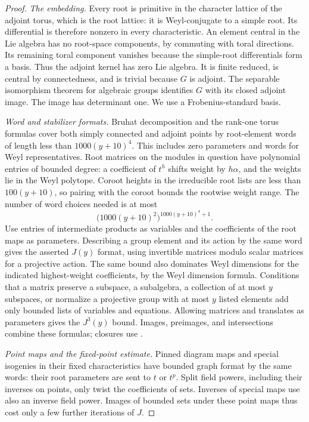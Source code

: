 \begin{proof}
\emph{The embedding.}
Every root is primitive in the character lattice of the adjoint torus,
which is the root lattice: it is Weyl-conjugate to a simple root.  Its
differential is therefore nonzero in every characteristic.  An element
central in the Lie algebra has no root-space components, by commuting with
toral directions.  Its remaining toral component vanishes because the
simple-root differentials form a basis.  Thus the adjoint kernel has zero
Lie algebra.  It is finite reduced, is central by connectedness, and is
trivial because $G$ is adjoint.  The separable isomorphism theorem for
algebraic groups identifies $G$ with its closed adjoint image.  The image
has determinant one.  We use a Frobenius-standard basis.

\emph{Word and stabilizer formats.}
Bruhat decomposition and the rank-one torus formulas cover both simply
connected and adjoint points by root-element words of length less than
$1000(y+10)^4$.  This includes zero parameters and words for Weyl
representatives.  Root matrices on the modules in question have polynomial
entries of bounded degree: a coefficient of $t^h$ shifts weight by $h\alpha$,
and the weights lie in the Weyl polytope.  Coroot heights in the irreducible
root lists are less than $100(y+10)$, so pairing with the coroot bounds the
rootwise weight range.  The number of word choices needed is at most
\begin{equation}\label{q:word-choices}
             \bigl(1000(y+10)^2\bigr)^{1000(y+10)^4+1}.
\end{equation}
Use entries of intermediate products as variables and the coefficients of
the root maps as parameters.  Describing a group element and its action by
the same word gives the asserted $J(y)$ format, using invertible matrices
modulo scalar matrices for a projective action.  The same bound also
dominates Weyl dimensions for the indicated highest-weight coefficients, by
the Weyl dimension formula.  Conditions that a matrix preserve a subspace,
a subalgebra, a collection of at most $y$ subspaces, or normalize a
projective group with at most $y$ listed elements add only bounded lists of
variables and equations.  Allowing matrices and translates as parameters
gives the $J^3(y)$ bound.  Images, preimages, and intersections combine these
formulas; closures use .

\emph{Point maps and the fixed-point estimate.}
Pinned diagram maps and special isogenies in their fixed characteristics
have bounded graph format by the same words: their root parameters are
sent to $t$ or $t^p$.  Split field powers, including their inverses on
points, only twist the coefficients of sets.  Inverses of special maps use
also an inverse field power.  Images of bounded sets under these point
maps thus cost only a few further iterations of $J$.


\end{proof}
